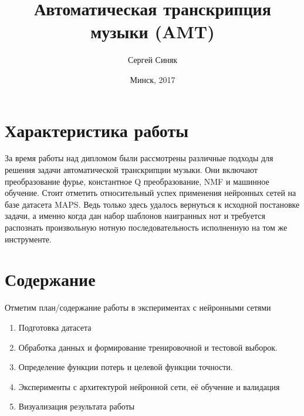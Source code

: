 \documentclass[unicode]{beamer}
\title{Автоматическая транскрипция музыки (AMT)}
\author{Сергей Синяк}
\date{Минск, 2017}
\begin{document}
\begin{frame}
	\titlepage
\end{frame}

\section{Характеристика работы}
\begin{frame}
  За время работы над дипломом были рассмотрены различные подходы
  для решения задачи автоматической транскрипции музыки.
  Они включают преобразование фурье, константное Q преобразование,
  NMF и машинное обучение.
  Стоит отметить относительный успех применения нейронных сетей
  на базе датасета MAPS. Ведь только здесь удалось вернуться
  к исходной постановке задачи, а именно когда
  дан набор шаблонов наигранных нот и требуется распознать
  произвольную нотную последовательность исполненную на том же
  инструменте.
\end{frame}

\section{Содержание}

\begin{frame}
   Отметим план/содержание работы в экспериментах с нейронными сетями
  \begin{enumerate}
    \item Подготовка датасета
    \item Обработка данных и формирование тренировочной и тестовой выборок.
    \item Определение функции потерь и целевой функции точности.
    \item Эксперименты с архитектурой нейронной сети, её обучение и
      валидация
    \item Визуализация результата работы
  \end{enumerate}
\end{frame}
\end{document}
